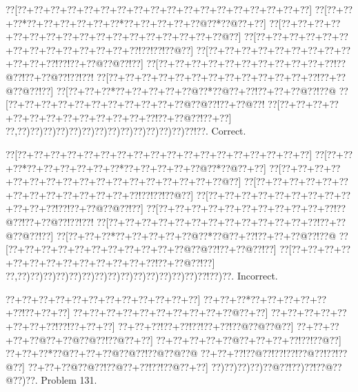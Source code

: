 \documentclass[a5paper]{article}
\begin{document}
\begin{center}
{\goo
\0??[\0??+\0??+\0??+\0??+\0??+\0??+\0??+\0??+\0??+\0??+\0??+\0??+\0??+\0??+\0??+\0??+\0??+\0??]
\0??[\0??+\0??+\0??*\0??+\0??+\0??+\0??+\0??+\0??*\0??+\0??+\0??+\0??+\0??@\0??*\0??@\0??+\0??]
\0??[\0??+\0??+\0??+\0??+\0??+\0??+\0??+\0??+\0??+\0??+\0??+\0??+\0??+\0??+\0??+\0??+\0??@\0??]
\0??[\0??+\0??+\0??+\0??+\0??+\0??+\0??+\0??+\0??+\0??+\0??+\0??+\0??+\0??!\0??!\0??!\0??@\0??]
\0??[\0??+\0??+\0??+\0??+\0??+\0??+\0??+\0??+\0??+\0??+\0??+\0??!\0??!\0??+\0??@\0??@\0??!\0??]
\0??[\0??+\0??+\0??+\0??+\0??+\0??+\0??+\0??+\0??+\0??+\0??!\0??@\0??!\0??+\0??@\0??!\0??!\0??!
\0??[\0??+\0??+\0??+\0??+\0??+\0??+\0??+\0??+\0??+\0??+\0??+\0??+\0??!\0??+\0??@\0??@\0??!\0??]
\0??[\0??+\0??+\0??*\0??+\0??+\0??+\0??+\0??@\0??*\0??@\0??+\0??!\0??+\0??+\0??@\0??!\0??@
\0??[\0??+\0??+\0??+\0??+\0??+\0??+\0??+\0??+\0??+\0??+\0??@\0??@\0??!\0??+\0??@\0??!
\0??[\0??+\0??+\0??+\0??+\0??+\0??+\0??+\0??+\0??+\0??+\0??+\0??+\0??!\0??+\0??@\0??!\0??+\0??]
\0??,\0??)\0??)\0??)\0??)\0??)\0??)\0??)\0??)\0??)\0??)\0??)\0??)\0??)\0??!\0??.
}
Correct. 

\end{center}
\begin{center}
{\goo
\0??[\0??+\0??+\0??+\0??+\0??+\0??+\0??+\0??+\0??+\0??+\0??+\0??+\0??+\0??+\0??+\0??+\0??+\0??]
\0??[\0??+\0??+\0??*\0??+\0??+\0??+\0??+\0??+\0??*\0??+\0??+\0??+\0??+\0??@\0??*\0??@\0??+\0??]
\0??[\0??+\0??+\0??+\0??+\0??+\0??+\0??+\0??+\0??+\0??+\0??+\0??+\0??+\0??+\0??+\0??+\0??@\0??]
\0??[\0??+\0??+\0??+\0??+\0??+\0??+\0??+\0??+\0??+\0??+\0??+\0??+\0??+\0??!\0??!\0??!\0??@\0??]
\0??[\0??+\0??+\0??+\0??+\0??+\0??+\0??+\0??+\0??+\0??+\0??+\0??!\0??!\0??+\0??@\0??@\0??!\0??]
\0??[\0??+\0??+\0??+\0??+\0??+\0??+\0??+\0??+\0??+\0??+\0??!\0??@\0??!\0??+\0??@\0??!\0??!\0??!
\0??[\0??+\0??+\0??+\0??+\0??+\0??+\0??+\0??+\0??+\0??+\0??+\0??+\0??!\0??+\0??@\0??@\0??!\0??]
\0??[\0??+\0??+\0??*\0??+\0??+\0??+\0??+\0??@\0??*\0??@\0??+\0??!\0??+\0??+\0??@\0??!\0??@
\0??[\0??+\0??+\0??+\0??+\0??+\0??+\0??+\0??+\0??+\0??+\0??@\0??@\0??!\0??+\0??@\0??!\0??]
\0??[\0??+\0??+\0??+\0??+\0??+\0??+\0??+\0??+\0??+\0??+\0??+\0??+\0??!\0??+\0??@\0??!\0??]
\0??,\0??)\0??)\0??)\0??)\0??)\0??)\0??)\0??)\0??)\0??)\0??)\0??)\0??)\0??)\0??!\0??)\0??.
}
Incorrect. 

\end{center}
\newpage
\begin{center}
{\goo
\0??+\0??+\0??+\0??+\0??+\0??+\0??+\0??+\0??+\0??+\0??+\0??]
\0??+\0??+\0??*\0??+\0??+\0??+\0??+\0??+\0??!\0??+\0??+\0??]
\0??+\0??+\0??+\0??+\0??+\0??+\0??+\0??+\0??+\0??@\0??+\0??]
\0??+\0??+\0??+\0??+\0??+\0??+\0??+\0??!\0??!\0??+\0??+\0??]
\0??+\0??+\0??!\0??+\0??!\0??!\0??+\0??!\0??@\0??@\0??@\0??]
\0??+\0??+\0??+\0??+\0??@\0??+\0??@\0??@\0??!\0??@\0??+\0??]
\0??+\0??+\0??+\0??+\0??@\0??+\0??+\0??+\0??!\0??!\0??@\0??]
\0??+\0??+\0??*\0??@\0??+\0??+\0??@\0??@\0??!\0??@\0??@\0??@
\0??+\0??+\0??!\0??@\0??!\0??!\0??!\0??@\0??!\0??!\0??@\0??]
\0??+\0??+\0??@\0??@\0??!\0??@\0??+\0??!\0??!\0??@\0??+\0??]
\0??)\0??)\0??)\0??)\0??@\0??!\0??)\0??!\0??@\0??@\0??)\0??.
}
Problem 131.

\end{center}
\end{document}
